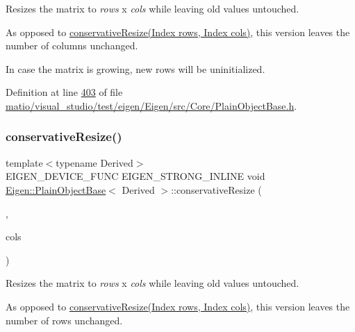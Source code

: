 Resizes the matrix to {\itshape rows} x {\itshape cols} while leaving old values untouched.

As opposed to \hyperlink{class_eigen_1_1_plain_object_base_a5e06c62950ba98fe8ba9c7d4be9c19e4}{conservative\+Resize(\+Index rows, Index cols)}, this version leaves the number of columns unchanged.

In case the matrix is growing, new rows will be uninitialized. 

Definition at line \hyperlink{matio_2visual__studio_2test_2eigen_2_eigen_2src_2_core_2_plain_object_base_8h_source_l00403}{403} of file \hyperlink{matio_2visual__studio_2test_2eigen_2_eigen_2src_2_core_2_plain_object_base_8h_source}{matio/visual\+\_\+studio/test/eigen/\+Eigen/src/\+Core/\+Plain\+Object\+Base.\+h}.

\mbox{\label{class_eigen_1_1_plain_object_base_a46afa73816539b0fe36c6e9abd7978a6}} 
\subsubsection{\texorpdfstring{conservative\+Resize()}{conservativeResize()}\hspace{0.1cm}{\footnotesize\ttfamily [5/8]}}
{\footnotesize\ttfamily template$<$typename Derived$>$ \\
E\+I\+G\+E\+N\+\_\+\+D\+E\+V\+I\+C\+E\+\_\+\+F\+U\+NC E\+I\+G\+E\+N\+\_\+\+S\+T\+R\+O\+N\+G\+\_\+\+I\+N\+L\+I\+NE void \hyperlink{class_eigen_1_1_plain_object_base}{Eigen\+::\+Plain\+Object\+Base}$<$ Derived $>$\+::conservative\+Resize (\begin{DoxyParamCaption}\item[{No\+Change\+\_\+t}]{,  }\item[{\hyperlink{namespace_eigen_a62e77e0933482dafde8fe197d9a2cfde}{Index}}]{cols }\end{DoxyParamCaption})\hspace{0.3cm}{\ttfamily [inline]}}

Resizes the matrix to {\itshape rows} x {\itshape cols} while leaving old values untouched.

As opposed to \hyperlink{class_eigen_1_1_plain_object_base_a5e06c62950ba98fe8ba9c7d4be9c19e4}{conservative\+Resize(\+Index rows, Index cols)}, this version leaves the number of rows unchanged.

